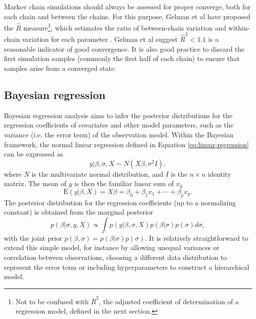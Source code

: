 Markov chain simulations should always be assessed for proper converge, both
for each chain and between the chains. For this purpose, Gelman et al have
proposed the $\hat{R}$ measure\footnote{Not to be confused with $\bar{R}^2$,
the adjusted coefficient of determination of a regression model, defined in
the next section.}, which estimates the ratio of between-chain variation and
within-chain variation for each parameter \citep{Gelman2013}. Gelman et al
suggest $\hat{R}^2 < 1.1$ is a reasonable indicator of good convergence. It is
also good practice to discard the first simulation samples (commonly the first
half of each chain) to ensure that samples arise from a converged state.


\subsection{Bayesian regression}

Bayesian regression analysis aims to infer the posterior distributions
for the regression coefficients of covariates and other model parameters,
such as the variance (i.e. the error term) of the observation model.
Within the Bayesian framework, the normal linear regression defined in
Equation \ref{eq:linear-regression} can be expressed as
\begin{equation}
  y | \beta, \sigma, X \sim N(X \beta, \sigma^2I),
  \label{eq:bayesian-linear-regression}
\end{equation}
where $N$ is the multivariate normal distribution, and $I$ is the $n \times n$
identity matrix. The mean of $y$ is then the familiar linear sum of $x_k$
\begin{equation}
  \textrm{E}(y|\beta,X) = X \beta = \beta_0 + \beta_1 x_1 + \dotsb + \beta_p x_p.
\end{equation}
The posterior distribution for the regression coefficients (up to a
normalizing constant) is obtained from the marginal posterior
\begin{equation}
  p(\beta | \sigma, y, X) \propto \int p(y | \beta, \sigma, X) p(\beta | \sigma) p(\sigma) d\sigma,
\end{equation}
with the joint prior $p(\beta, \sigma) = p(\beta | \sigma) p(\sigma)$.
It is relatively straightforward to extend this simple model, for instance by
allowing unequal variances or correlation between observations, choosing a
different data distribution
to represent the error term or including hyperparameters to construct a
hierarchical model.

